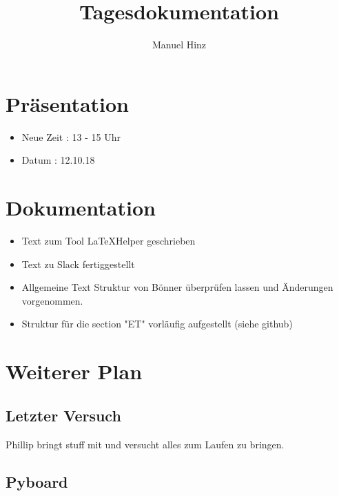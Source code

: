 \documentclass{article}
\author{Manuel Hinz}
\title{Tagesdokumentation}
\begin{document}
\maketitle

\section{Pr\"{a}sentation}

\begin{itemize}

\item Neue Zeit : 13 - 15 Uhr

\item Datum : 12.10.18

\end{itemize}

\section{Dokumentation}

\begin{itemize}

\item Text zum Tool LaTeXHelper geschrieben

\item Text zu Slack fertiggestellt 

\item Allgemeine Text Struktur von B\"{o}nner \"{u}berpr\"{u}fen lassen und \"{A}nderungen vorgenommen.

\item Struktur f\"{u}r die section "ET" vorl\"{a}ufig aufgestellt (siehe github)

\end{itemize}

\section{Weiterer Plan}

\subsection{Letzter Versuch}

Phillip bringt stuff mit und versucht alles zum Laufen zu bringen.

\subsection{Pyboard}
\end{document}
